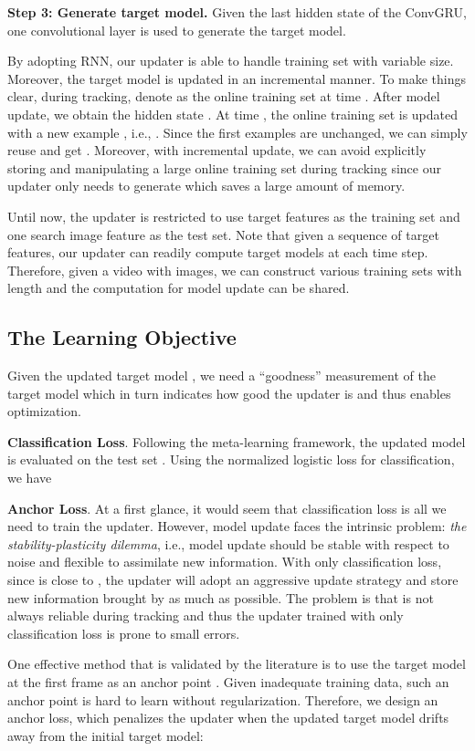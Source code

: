 \documentclass[journal]{IEEEtran}
\begin{document}
\textbf{Step 3: Generate target model.} Given the last hidden state of the ConvGRU, one convolutional layer is used to generate the target model.

By adopting RNN, our updater is able to handle training set with variable size. Moreover, the target model is updated in an incremental manner. To make things clear, during tracking, denote  as the online training set at time . After model update, we obtain the hidden state . At time , the online training set is updated with a new example , i.e., . Since the first  examples are unchanged, we can simply reuse  and get . Moreover, with incremental update, we can avoid explicitly storing and manipulating a large online training set during tracking since our updater only needs  to generate  which saves a large amount of memory.

Until now, the updater is restricted to use  target features as the training set and one search image feature as the test set. Note that given a sequence of  target features, our updater can readily compute  target models at each time step. Therefore, given a video with  images, we can construct various training sets with length  and the computation for model update can be shared.

\subsection{The Learning Objective}
Given the updated target model , we need a ``goodness'' measurement of the target model which in turn indicates how good the updater is and thus enables optimization. 

\textbf{Classification Loss}. Following the meta-learning framework, the updated model is evaluated on the test set . Using the normalized logistic loss for classification, we have


\textbf{Anchor Loss}. At a first glance, it would seem that classification loss is all we need to train the updater. However, model update faces the intrinsic problem: \emph{the stability-plasticity dilemma}, i.e., model update should be stable with respect to noise and flexible to assimilate new information. With only classification loss, since  is close to , the updater will adopt an aggressive update strategy and store new information brought by  as much as possible. The problem is that  is not always reliable during tracking and thus the updater trained with only classification loss is prone to small errors. 

One effective method that is validated by the literature is to use the target model at the first frame as an anchor point \cite{matthews2004template, guo2017learning}. Given inadequate training data, such an anchor point is hard to learn without regularization. Therefore, we design an anchor loss, which penalizes the updater when the updated target model drifts away from the initial target model:
\end{document}
